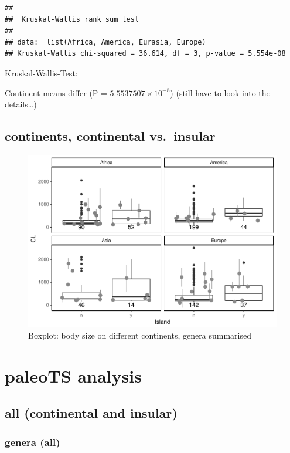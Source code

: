 \documentclass[]{article}
\begin{document}
\begin{verbatim}
## 
##  Kruskal-Wallis rank sum test
## 
## data:  list(Africa, America, Eurasia, Europe)
## Kruskal-Wallis chi-squared = 36.614, df = 3, p-value = 5.554e-08
\end{verbatim}

Kruskal-Wallis-Test:

Continent means differ (P = \(5.5537507\times 10^{-8}\)) (still have to
look into the details\ldots{})

\newpage

\subsection{continents, continental
vs.~insular}\label{continents-continental-vs.insular}

\begin{figure}[htbp]
\centering
\includegraphics{MA_JJ_files/figure-latex/BPConCI-1.pdf}
\caption{Boxplot: body size on different continents, genera summarised}
\end{figure}

\newpage

\section{paleoTS analysis}\label{paleots-analysis}

\subsection{all (continental and
insular)}\label{all-continental-and-insular}

\subsubsection{genera (all)}\label{genera-all}
\end{document}
